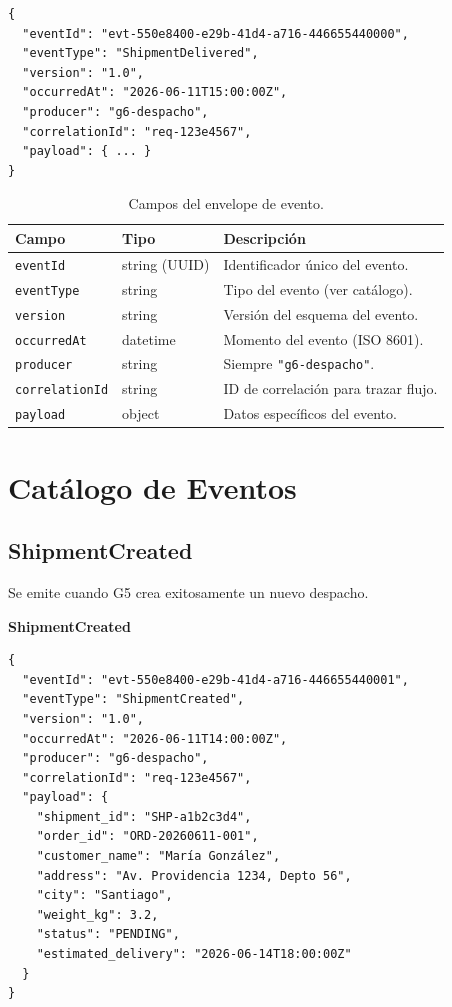 \documentclass[11pt, a4paper]{article}
\newcommand{\contractheader}[1]{%
  \noindent\colorbox{primary!10}{%
    \parbox{\dimexpr\textwidth-2\fboxsep}{%
      \textbf{\faFileCode\quad #1}%
    }%
  }
  \vspace{0.3cm}
}
\begin{document}
\begin{lstlisting}
{
  "eventId": "evt-550e8400-e29b-41d4-a716-446655440000",
  "eventType": "ShipmentDelivered",
  "version": "1.0",
  "occurredAt": "2026-06-11T15:00:00Z",
  "producer": "g6-despacho",
  "correlationId": "req-123e4567",
  "payload": { ... }
}
\end{lstlisting}

\begin{table}[h!]
\centering
\renewcommand{\arraystretch}{1.3}
\begin{tabularx}{\textwidth}{l l X}
  \toprule
  \textbf{Campo} & \textbf{Tipo} & \textbf{Descripción} \\
  \midrule
  \texttt{eventId}       & string (UUID) & Identificador único del evento. \\
  \texttt{eventType}     & string        & Tipo del evento (ver catálogo). \\
  \texttt{version}       & string        & Versión del esquema del evento. \\
  \texttt{occurredAt}    & datetime      & Momento del evento (ISO 8601). \\
  \texttt{producer}      & string        & Siempre \texttt{"g6-despacho"}. \\
  \texttt{correlationId} & string        & ID de correlación para trazar flujo. \\
  \texttt{payload}       & object        & Datos específicos del evento. \\
  \bottomrule
\end{tabularx}
\caption{Campos del envelope de evento.}
\end{table}


\section{Catálogo de Eventos}

\subsection{ShipmentCreated}

Se emite cuando G5 crea exitosamente un nuevo despacho.

\contractheader{ShipmentCreated}

\begin{lstlisting}
{
  "eventId": "evt-550e8400-e29b-41d4-a716-446655440001",
  "eventType": "ShipmentCreated",
  "version": "1.0",
  "occurredAt": "2026-06-11T14:00:00Z",
  "producer": "g6-despacho",
  "correlationId": "req-123e4567",
  "payload": {
    "shipment_id": "SHP-a1b2c3d4",
    "order_id": "ORD-20260611-001",
    "customer_name": "María González",
    "address": "Av. Providencia 1234, Depto 56",
    "city": "Santiago",
    "weight_kg": 3.2,
    "status": "PENDING",
    "estimated_delivery": "2026-06-14T18:00:00Z"
  }
}
\end{lstlisting}
\end{document}
